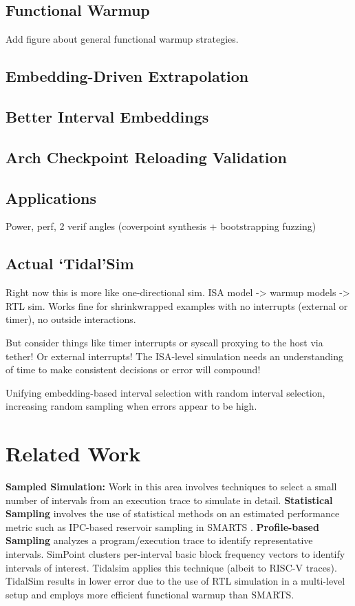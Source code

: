 \documentclass[sigplan,nonacm,10pt]{acmart}
\begin{document}
\subsection{Functional Warmup}

Add figure about general functional warmup strategies.

\subsection{Embedding-Driven Extrapolation}

\subsection{Better Interval Embeddings}

\subsection{Arch Checkpoint Reloading Validation}

\subsection{Applications}

Power, perf, 2 verif angles (coverpoint synthesis + bootstrapping fuzzing)

\subsection{Actual `Tidal'Sim}

Right now this is more like one-directional sim. ISA model -> warmup models -> RTL sim.
Works fine for shrinkwrapped examples with no interrupts (external or timer), no outside interactions.

But consider things like timer interrupts or syscall proxying to the host via tether! Or external interrupts!
The ISA-level simulation needs an understanding of time to make consistent decisions or error will compound!

Unifying embedding-based interval selection with random interval selection, increasing random sampling when errors appear to be high.

\section{Related Work}

\textbf{Sampled Simulation:} Work in this area involves techniques to select a small number of intervals from an execution trace to simulate in detail. 
\textbf{Statistical Sampling} involves the use of statistical methods on an estimated performance metric such as IPC-based reservoir sampling in SMARTS \cite{wunderlich2003smarts}.
\textbf{Profile-based Sampling} analyzes a program/execution trace to identify representative intervals. SimPoint \cite{sherwood2002automatically} clusters per-interval basic block frequency vectors to identify intervals of interest. Tidalsim applies this technique (albeit to RISC-V traces). 
TidalSim results in lower error due to the use of RTL simulation in a multi-level setup and employs more efficient functional warmup than SMARTS.
\end{document}
